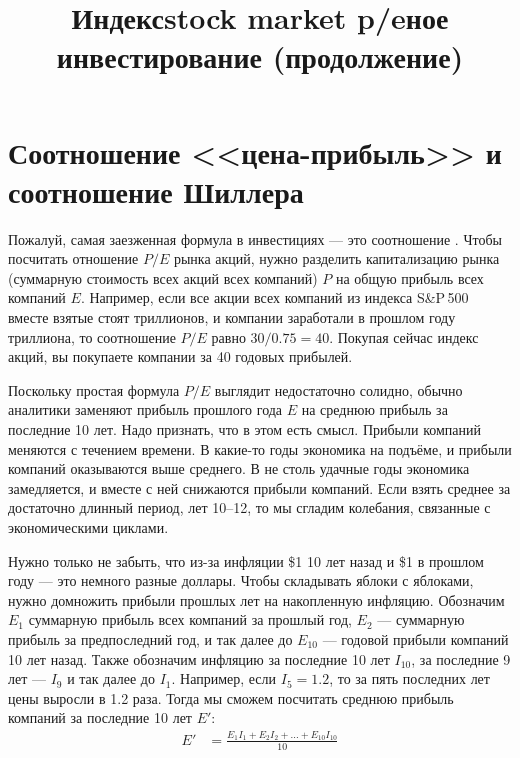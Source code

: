 
\title{Индексstock market p/eное инвестирование (продолжение)}



\section*{Соотношение <<цена-прибыль>> и соотношение Шиллера}


Пожалуй, самая заезженная формула в инвестициях --- это соотношение . Чтобы посчитать отношение $P/E$ рынка акций, нужно разделить капитализацию рынка (суммарную стоимость всех акций всех компаний) $P$ на общую прибыль всех компаний $E$. Например, если все акции всех компаний из индекса S\&P\,500 вместе взятые стоят  триллионов, и компании заработали в прошлом году  триллиона, то соотношение $P/E$ равно $30/0.75 = 40$. Покупая сейчас индекс акций, вы покупаете компании за 40 годовых прибылей.

Поскольку простая формула $P/E$ выглядит недостаточно солидно, обычно аналитики заменяют прибыль прошлого года $E$ на среднюю прибыль за последние 10 лет. Надо признать, что в этом есть смысл. Прибыли компаний меняются с течением времени. В какие-то годы экономика на подъёме, и прибыли компаний оказываются выше среднего. В не столь удачные годы экономика замедляется, и вместе с ней снижаются прибыли компаний. Если взять среднее за достаточно длинный период, лет 10--12, то мы сгладим колебания, связанные с экономическими циклами.

Нужно только не забыть, что из-за инфляции \$1 10 лет назад и \$1 в прошлом году --- это немного разные доллары. Чтобы складывать яблоки с яблоками, нужно домножить прибыли прошлых лет на накопленную инфляцию. Обозначим $E_{1}$ суммарную прибыль всех компаний за прошлый год, $E_2$ --- суммарную прибыль за предпоследний год, и так далее до $E_{10}$ --- годовой прибыли компаний 10 лет назад. Также обозначим инфляцию за последние 10 лет $I_{10}$, за последние 9 лет --- $I_9$ и так далее до $I_1$. Например, если $I_5=1.2$, то за пять последних лет цены выросли в 1.2 раза. Тогда мы сможем посчитать среднюю прибыль компаний за последние 10 лет  $E'$:
\begin{align}
E' &= \frac{E_1I_1 + E_2I_2 + ... + E_{10}I_{10}}{10}
\end{align}

